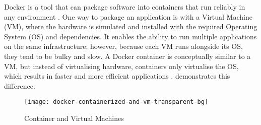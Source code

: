 Docker is a tool that can package software into containers that run reliably in
any environment \cite{docker-runtime}. One way to package an application is
with a Virtual Machine (VM), where the hardware is simulated and installed with
the required Operating System (OS) and dependencies. It enables the ability to
run multiple applications on the same infrastructure; however, because each VM
runs alongside its OS, they tend to be bulky and slow. A Docker container is
conceptually similar to a VM, but instead of virtualising hardware, containers
only virtualise the OS, which results in faster and more efficient applications
\cite{docker-container-vm}.  demonstrates this
difference.

\begin{figure*}[!htb]
  \centering
  \texttt{[image: docker-containerized-and-vm-transparent-bg]}
  \caption{Container and Virtual Machines}
  \label{fig:docker_container_vm}
\end{figure*}
